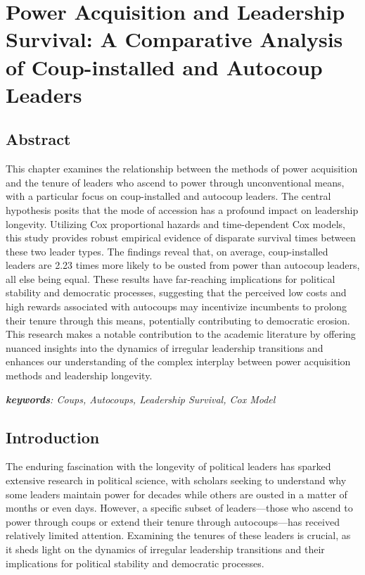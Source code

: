 \documentclass[
  12pt,
]{report}
\begin{document}
\chapter{Power Acquisition and Leadership Survival: A Comparative
Analysis of Coup-installed and Autocoup
Leaders}\label{power-acquisition-and-leadership-survival-a-comparative-analysis-of-coup-installed-and-autocoup-leaders}

\section*{Abstract}\label{abstract-3}

This chapter examines the relationship between the methods of power
acquisition and the tenure of leaders who ascend to power through
unconventional means, with a particular focus on coup-installed and
autocoup leaders. The central hypothesis posits that the mode of
accession has a profound impact on leadership longevity. Utilizing Cox
proportional hazards and time-dependent Cox models, this study provides
robust empirical evidence of disparate survival times between these two
leader types. The findings reveal that, on average, coup-installed
leaders are 2.23 times more likely to be ousted from power than autocoup
leaders, all else being equal. These results have far-reaching
implications for political stability and democratic processes,
suggesting that the perceived low costs and high rewards associated with
autocoups may incentivize incumbents to prolong their tenure through
this means, potentially contributing to democratic erosion. This
research makes a notable contribution to the academic literature by
offering nuanced insights into the dynamics of irregular leadership
transitions and enhances our understanding of the complex interplay
between power acquisition methods and leadership longevity.

\emph{\textbf{keywords}: Coups, Autocoups, Leadership Survival, Cox
Model}

\newpage

\section{Introduction}\label{introduction-3}

The enduring fascination with the longevity of political leaders has
sparked extensive research in political science, with scholars seeking
to understand why some leaders maintain power for decades while others
are ousted in a matter of months or even days. However, a specific
subset of leaders---those who ascend to power through coups or extend
their tenure through autocoups---has received relatively limited
attention. Examining the tenures of these leaders is crucial, as it
sheds light on the dynamics of irregular leadership transitions and
their implications for political stability and democratic processes.
\end{document}
